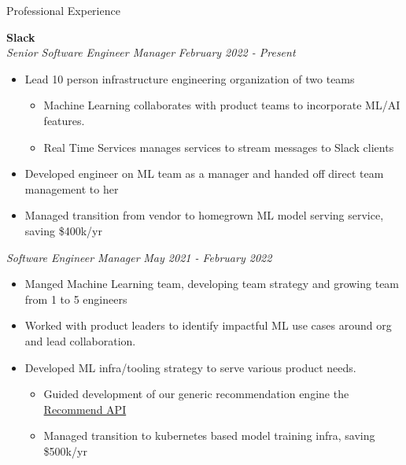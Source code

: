 \documentclass{resume} %
\begin{document}
\begin{rSection}{Professional Experience}

\vspace{0.2em}

{\bf Slack} \\
{\em Senior Software Engineer Manager} \hfill {\em February 2022 - Present}  \vspace{0.1em} 
\begin{itemize} \itemsep -0.2em
	\item Lead 10 person infrastructure engineering organization of two teams
	\vspace{-0.2em}
        \begin{itemize} \itemsep -0.2em
            \item Machine Learning collaborates with product teams to incorporate ML/AI features.
            \item Real Time Services manages services to stream messages to Slack clients
        \end{itemize}
    \item Developed engineer on ML team as a manager and handed off direct team management to her
    \item Managed transition from vendor to homegrown ML model serving service, saving \$400k/yr
\end{itemize}
{\em Software Engineer Manager} \hfill {\em May 2021 - February 2022} \vspace{0.1em} 
\begin{itemize} \itemsep -0.2em
	\item Manged Machine Learning team, developing team strategy and growing team from 1 to 5 engineers
	\item Worked with product leaders to identify impactful ML use cases around org and lead collaboration.
	\item Developed ML infra/tooling strategy to serve various product needs.
	\vspace{-0.2em}
        \begin{itemize} \itemsep -0.2em
            \item Guided development of our generic recommendation engine the \href{https://slack.engineering/recommend-api/}{Recommend API} 
            \item Managed transition to kubernetes based model training infra, saving \$500k/yr
        \end{itemize}
\end{itemize}

\end{rSection}
\end{document}
